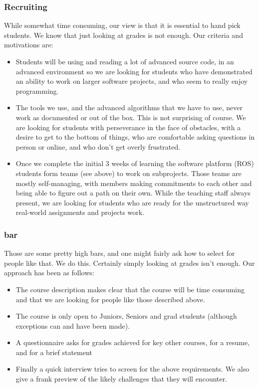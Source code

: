 \subsubsection{Recruiting}While somewhat time consuming, our view is that it is essential to hand pick students. We know that just looking at grades is not enough.  Our criteria and motivations are:
\begin{itemize}
\item Students will be using and reading a lot of advanced source code, in an advanced environment so we are looking for students who have demonstrated an ability to work on larger software projects, and who seem to really enjoy programming.
\item The tools we use, and the advanced algorithms that we have to use, never work as documented or out of the box. This is not surprising of course. We are looking for students with perseverance in the face of obstacles, with a desire to get to the bottom of things, who are comfortable asking questions in person or online, and who don't get overly frustrated.
\item Once we complete the initial 3 weeks of learning the software platform (ROS) students form teams (see above) to work on subprojects. Those teams are mostly self-managing, with members making commitments to each other and being able to figure out a path on their own. While the teaching staff always present, we are looking for students who are ready for the unstructured way real-world assignments and projects work.
\end{itemize}
\subsubsection{bar}
Those are some pretty high bars, and one might fairly ask how to select for people like that. We do this. Certainly simply looking at grades isn't enough. Our approach has been as follows: 
\begin{itemize}
\item The course description makes clear that the course will be time consuming and that we are looking for people like those described above.
\item The course is only open to Juniors, Seniors and grad students (although exceptions can and have been made).
\item A questionnaire asks for grades achieved for key other courses, for a resume, and for a brief statement
\item Finally a quick interview tries to screen for the above requirements.  We also give a frank preview of the likely challenges that they will encounter.
\end{itemize}

